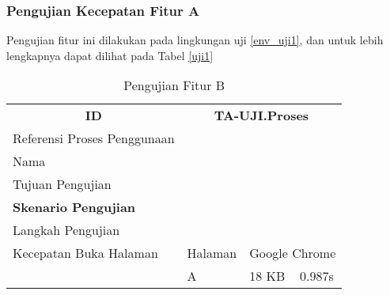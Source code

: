       \subsubsection{Pengujian Kecepatan Fitur A}
      Pengujian fitur ini dilakukan pada lingkungan uji \ref{env_uji1}, dan untuk lebih lengkapnya dapat dilihat pada Tabel \ref{uji1}
      \begin{table}[]
      \centering
      \caption{Pengujian Fitur B}
      \label{uji2}
      \begin{tabular}{llll}
      \multicolumn{1}{c}{\textbf{ID}} & \multicolumn{3}{c}{\textbf{TA-UJI.Proses}}        \\
      Referensi Proses Penggunaan     & \multicolumn{3}{l}{}                              \\
      Nama                            & \multicolumn{3}{l}{}                              \\
      Tujuan Pengujian                & \multicolumn{3}{l}{\multirow{2}{*}{}}             \\
      \textbf{Skenario Pengujian}     & \multicolumn{3}{l}{}                              \\
      Langkah Pengujian               & \multicolumn{3}{l}{}                              \\
      Kecepatan Buka Halaman          & Halaman       & \multicolumn{2}{l}{Google Chrome} \\
                                      & A             & 18 KB           & 0.987s         
      \end{tabular}
      \end{table}
      